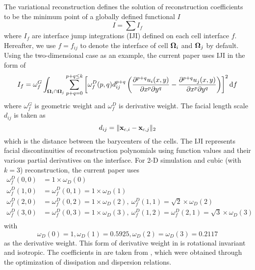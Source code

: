 The variational reconstruction defines the solution of reconstruction coefficients
to be the minimum point of a globally defined functional $I$
\begin{equation}
    I = \sum{I_f}
\end{equation}
where $I_f$ are interface jump integrations (IJI) defined on each cell interface $f$.
Hereafter, we use $f=f_{ij}$ to denote the interface of cell $\mathbf{\Omega}_{i}$ and $\mathbf{\Omega}_{j}$ by default.
Using the two-dimensional case as an example, the current paper uses IJI in the form of
\begin{equation}
    I_f = \omega_f^G\int_{\OO_i \cap \OO_j}{
        \sum_{p+q=0}^{p + q\leq k}\left[
            \omega_f^D(p,q)
            d_{ij}^{p+q}
            \left(
            \partialderivative{^{p+q}u_i(x,y)}{x^p\partial y^q}
            -
            \partialderivative{^{p+q}u_j(x,y)}{x^p\partial y^q}
            \right)
            \right]^2
        \dd f
    }
\end{equation}
where $\omega_f^G$ is geometric weight and
$\omega_f^D$ is derivative weight.
The facial length scale  $d_{ij}$
is taken as
\begin{equation}
    d_{ij} = \|\mathbf{x}_{c,i}-\mathbf{x}_{c,j}\|_2
\end{equation}
which is the distance between the barycenters of the cells.
The IJI represents facial discontinuities of reconstruction polynomials using
function values and their various partial derivatives on the interface.
For 2-D simulation and cubic (with $k=3$)
reconstruction, the current paper uses
\begin{equation}
    \begin{aligned}
        \omega_f^D(0,0) & = 1\times \omega_D(0)                                                                                    \\
        \omega_f^D(1,0) & = \omega_f^D(0,1) = 1\times \omega_D(1)                                                                  \\
        \omega_f^D(2,0) & = \omega_f^D(0,2) = 1\times \omega_D(2),\ \omega_f^D(1,1) = \sqrt{2}\times \omega_D(2)                   \\
        \omega_f^D(3,0) & = \omega_f^D(0,3) = 1\times \omega_D(3),\ \omega_f^D(1,2) = \omega_f^D(2,1) = \sqrt{3}\times \omega_D(3) \\
    \end{aligned}
    \label{eq:wdRotRatio}
\end{equation}
with
\begin{equation}
    \omega_D(0) = 1, \omega_D(1) = 0.5925, \omega_D(2) = \omega_D(3) = 0.2117
    \label{eq:wdHQMOPT}
\end{equation}
as the derivative weight.
This form of derivative weight in  is rotational invariant and
isotropic.
The coefficients in  are taken from \cite{huang2022high}, which were
obtained through the
optimization of dissipation and dispersion relations.

